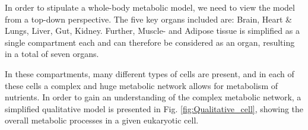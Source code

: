 \documentclass{IEEEtran}
\begin{document}
In order to stipulate a whole-body metabolic model, we need to view the model from a top-down perspective. The five key organs included are: Brain, Heart \& Lungs, Liver, Gut, Kidney. Further, Muscle- and Adipose tissue is simplified as a single compartment each and can therefore be considered as an organ, resulting in a total of seven organs.














In these compartments, many different types of cells are present, and in each of these cells a complex and huge metabolic network allows for metabolism of nutrients. In order to gain an understanding of the complex metabolic network, a simplified qualitative model is presented in Fig. \ref{fig:Qualitative_cell}, showing the overall metabolic processes in a given eukaryotic cell.
\end{document}
